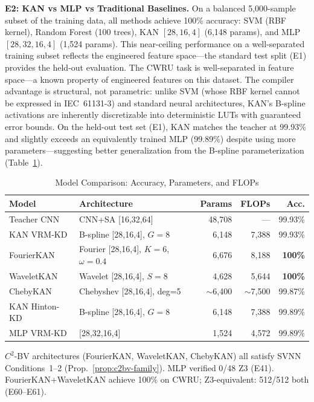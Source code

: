 \documentclass[journal,onecolumn]{IEEEtran}
\begin{document}
\noindent\textbf{E2: KAN vs MLP vs Traditional Baselines.} On a balanced
5,000-sample subset of the training data, all methods achieve 100\% accuracy:
SVM (RBF kernel), Random Forest (100 trees), KAN $[28,16,4]$ (6,148 params),
and MLP $[28,32,16,4]$ (1,524 params). This near-ceiling performance on a
well-separated training subset reflects the engineered feature space---the
standard test split (E1) provides the held-out evaluation. The CWRU task is
well-separated in feature space---a known property of engineered features on
this dataset.
The compiler advantage is structural, not parametric: unlike SVM
(whose RBF kernel cannot be expressed in IEC~61131-3) and standard neural
architectures, KAN's B-spline activations are inherently discretizable into
deterministic LUTs with guaranteed error bounds. On the held-out test set
(E1), KAN matches the teacher at 99.93\% and slightly exceeds an equivalently
trained MLP (99.89\%) despite using more parameters---suggesting better
generalization from the B-spline parameterization (Table~\ref{tab:models}).

\begin{table}[t]
\centering
\caption{Model Comparison: Accuracy, Parameters, and FLOPs}
\label{tab:models}
\footnotesize
\begin{tabular}{@{}p{1.55cm}p{3.0cm}rrr@{}}
\toprule
\textbf{Model} & \textbf{Architecture} & \textbf{Params} & \textbf{FLOPs} & \textbf{Acc.} \\
\midrule
Teacher CNN   & CNN+SA [16,32,64]   & 48,708 & ---   & 99.93\% \\
KAN VRM-KD    & B-spline [28,16,4], $G{=}8$ & 6,148  & 7,388 & 99.93\% \\
FourierKAN    & Fourier [28,16,4], $K{=}6$, \newline $\omega{=}0.4$ & 6,676 & 8,188 & \textbf{100\%} \\
WaveletKAN    & Wavelet [28,16,4], \newline $S{=}8$ & 4,628 & 5,644 & \textbf{100\%} \\
ChebyKAN      & Chebyshev [28,16,4], deg{=}5 & $\sim$6,400 & $\sim$7,500 & 99.87\% \\
KAN Hinton-KD & B-spline [28,16,4], $G{=}8$ & 6,148  & 7,388 & 99.89\% \\
MLP VRM-KD    & [28,32,16,4]       & 1,524  & 4,572 & 99.89\% \\
\bottomrule
\end{tabular}
\vspace{1pt}
{\scriptsize $C^2$-BV architectures (FourierKAN, WaveletKAN, ChebyKAN) all satisfy
SVNN Conditions~1--2 (Prop.~\ref{prop:c2bv-family}). MLP verified 0/48 Z3 (E41).
FourierKAN+WaveletKAN achieve 100\% on CWRU; Z3-equivalent: 512/512 both (E60--E61).}
\end{table}
\end{document}
